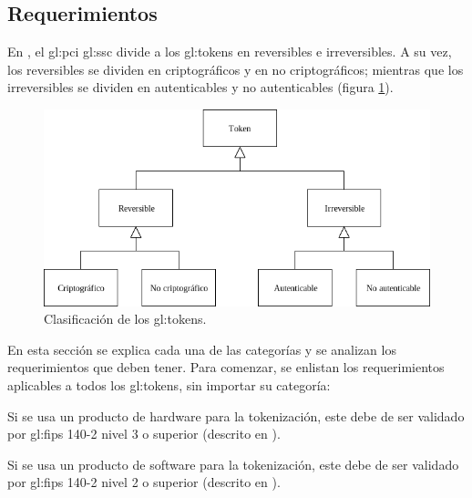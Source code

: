 %
%

\subsection{Requerimientos}
\label{sec:requerimientos}

En \cite{pci_tokens}, el \gls{gl:pci} \gls{gl:ssc} divide a los
\glspl{gl:token} en reversibles e irreversibles. A su vez, los reversibles se
dividen en criptográficos y en no criptográficos; mientras que los
irreversibles se dividen en autenticables y no autenticables (figura
\ref{fig:division_tokens}).

\begin{figure}[H]
  \begin{center}
    \includegraphics[width=0.75\linewidth]
      {contenidos/analisis_y_disenio/tokens/requerimientos/diagramas/clasificacion.png}
    \caption{Clasificación de los \glspl{gl:token}.}
    \label{fig:division_tokens}
  \end{center}
\end{figure}

En esta sección se explica cada una de las categorías y se analizan los
requerimientos que deben tener. Para comenzar, se enlistan los requerimientos
aplicables a todos los \glspl{gl:token}, sin importar su categoría:

{
  Si se usa un producto de hardware para la tokenización, este debe de ser
  validado por \gls{gl:fips} 140-2 nivel 3 o superior (descrito en
  \cite{nist_modulos_criptograficos}).
}

{
  Si se usa un producto de software para la tokenización, este debe de ser
  validado por \gls{gl:fips} 140-2 nivel 2 o superior (descrito en
  \cite{nist_modulos_criptograficos}).
}

